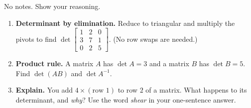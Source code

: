 \documentclass[10pt]{article}
\begin{document}
\namedateperiod

\vspace{0.15in}

No notes. Show your reasoning.

\begin{enumerate}[leftmargin=1.8em, itemsep=16pt]
  \item \textbf{Determinant by elimination.} Reduce to triangular and multiply the pivots to find
        $\det\begin{bmatrix} 1 & 2 & 0 \\ 3 & 7 & 1 \\ 0 & 2 & 5 \end{bmatrix}$. \; (No row swaps are needed.)
        \vspace{1.6cm}
  \item \textbf{Product rule.} A matrix $A$ has $\det A=3$ and a matrix $B$ has $\det B=5$. Find
        $\det(AB)$ and $\det A^{-1}$.
        \vspace{1.4cm}
  \item \textbf{Explain.} You add $4\times(\text{row }1)$ to row $2$ of a matrix. What happens to its
        determinant, and \emph{why}? Use the word \emph{shear} in your one-sentence answer.
\end{enumerate}
\end{document}
